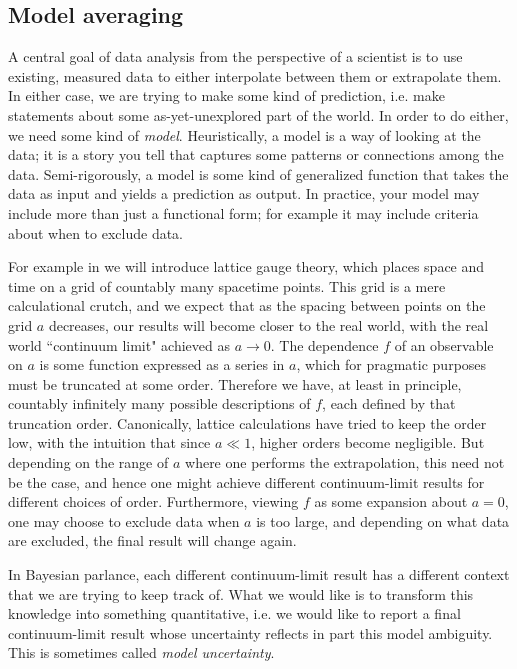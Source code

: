 \subsection{Model averaging}

A central goal of data analysis from the perspective of a scientist is to use
existing, measured data to either interpolate between them or extrapolate them.
In either case, we are trying to make some kind of prediction, i.e. make
statements about some as-yet-unexplored part of the world. In order to do
either, we need some kind of {\it model}. Heuristically, a model is
a way of looking at the data; it is a story you tell that captures some patterns
or connections among the data. Semi-rigorously, a model is some kind of
generalized function that takes the data as input and yields a prediction as output.
In practice, your model may include more than just a functional form; for
example it may include criteria about when to exclude data.

For example in  we will introduce lattice gauge theory,
which places space and time on a grid of countably many spacetime points. This
grid is a mere calculational crutch, and we expect that as the spacing between
points on the grid $a$ decreases, our results will become closer to the real world,
with the real world ``continuum limit" achieved as $a\to 0$. The dependence $f$ of
an observable on $a$ is some function expressed as a series in $a$, which for
pragmatic purposes must be truncated at some order. Therefore we have, at least in
principle, countably infinitely many possible descriptions of $f$, each defined
by that truncation order. Canonically, lattice calculations have tried to keep
the order low, with the intuition that since $a\ll1$, higher orders become
negligible. But depending on the range of $a$ where one performs the
extrapolation, this need not be the case, and hence one might achieve different
continuum-limit results for different choices of order. Furthermore, viewing $f$
as some expansion about $a=0$, one may choose to exclude data when $a$ is too
large, and depending on what data are excluded, the final result will change
again.

In Bayesian parlance, each different continuum-limit result has a different
context that we are trying to keep track of. What we would like is to transform
this knowledge into something quantitative, i.e. we would like to report a final
continuum-limit result whose uncertainty reflects in part this model ambiguity.
This is sometimes called {\it model uncertainty}.

